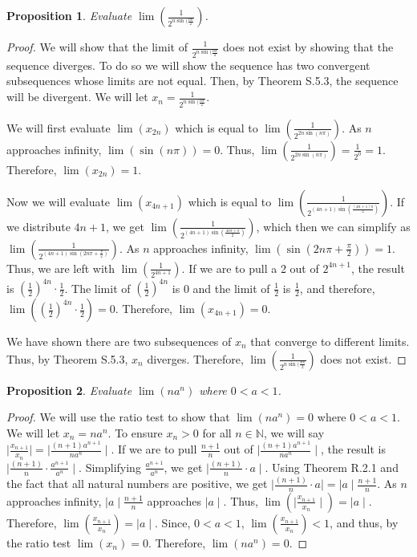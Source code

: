 \documentclass[11 pt]{article}
\newtheorem{proposition}{Proposition}
\newcommand{\newpar}{\vspace{.15in}\noindent}
\begin{document}
\newpar
\begin{proposition}
Evaluate $\lim(\frac{1}{2^{n\sin(\frac{n\pi}{2}}})$.
\end{proposition}
\begin{proof}
\newpar 
We will show that the limit of $\frac{1}{2^{n\sin(\frac{n\pi}{2}}}$ does not exist by showing that the sequence diverges. To do so we will show the sequence has two convergent subsequences whose limits are not equal. Then, by Theorem S.5.3, the sequence will be divergent. We will let $x_n=\frac{1}{2^{n\sin(\frac{n\pi}{2}}}$.

\newpar
We will first evaluate $\lim(x_{2n})$ which is equal to $\lim(\frac{1}{2^{2n\sin(n\pi)}})$. As $n$ approaches infinity, $\lim(\sin(n\pi))=0$. Thus, $\lim(\frac{1}{2^{2n\sin(n\pi)}})=\frac{1}{2^0}=1$. Therefore, $\lim(x_{2n})=1$.

\newpar
Now we will evaluate $\lim(x_{4n+1})$ which is equal to $\lim(\frac{1}{2^{(4n+1)\sin(\frac{(4n+1)\pi}{2})}})$. If we distribute $4n+1$, we get $\lim(\frac{1}{2^{(4n+1)\sin(\frac{4n\pi+\pi}{2})}})$, which then we can simplify as $\lim(\frac{1}{2^{(4n+1)\sin(2n\pi+\frac{\pi}{2})}})$. As $n$ approaches infinity, $\lim(\sin(2n\pi+\frac{\pi}{2}))=1$. Thus, we are left with $\lim(\frac{1}{2^{4n+1}})$. If we are to pull a 2 out of $2^{4n+1}$, the result is $(\frac{1}{2})^{4n}\cdot\frac{1}{2}$. The limit of $(\frac{1}{2})^{4n}$ is 0 and the limit of $\frac{1}{2}$ is $\frac{1}{2}$, and therefore, $\lim((\frac{1}{2})^{4n}\cdot\frac{1}{2})=0$. Therefore, $\lim(x_{4n+1})=0$.

\newpar
We have shown there are two subsequences of $x_n$ that converge to different limits. Thus, by Theorem S.5.3, $x_n$ diverges. Therefore, $\lim(\frac{1}{2^{n\sin(\frac{n\pi}{2}}})$ does not exist.
\end{proof}

\newpar
\begin{proposition}
Evaluate $\lim(na^n)$ where $0<a<1$.
\end{proposition}
\begin{proof}
\newpar 
We will use the ratio test to show that $\lim(na^n)=0$ where $0<a<1$. We will let $x_n=na^n$. To ensure $x_n>0$ for all $n\in\mathbb{N}$, we will say $\mid\frac{x_{n+1}}{x_n}\mid=\mid\frac{(n+1)a^{n+1}}{na^n}\mid$. If we are to pull $\frac{n+1}{n}$ out of $\mid\frac{(n+1)a^{n+1}}{na^n}\mid$, the result is $\mid\frac{(n+1)}{n}\cdot\frac{a^{n+1}}{a^n}\mid$. Simplifying $\frac{a^{n+1}}{a^n}$, we get $\mid\frac{(n+1)}{n}\cdot a\mid$. Using Theorem R.2.1 and the fact that all natural numbers are positive, we get $\mid\frac{(n+1)}{n}\cdot a\mid=\mid a\mid\frac{n+1}{n}$. As $n$ approaches infinity, $\mid a\mid\frac{n+1}{n}$ approaches $\mid a\mid$. Thus, $\lim(\mid\frac{x_{n+1}}{x_n}\mid)=\mid a\mid$. Therefore, $\lim(\frac{x_{n+1}}{x_n})=\mid a \mid$. Since, $0<a<1$, $\lim(\frac{x_{n+1}}{x_n})<1$, and thus, by the ratio test $\lim(x_n)=0$. Therefore, $\lim(na^n)=0$. 
\end{proof}
\end{document}
